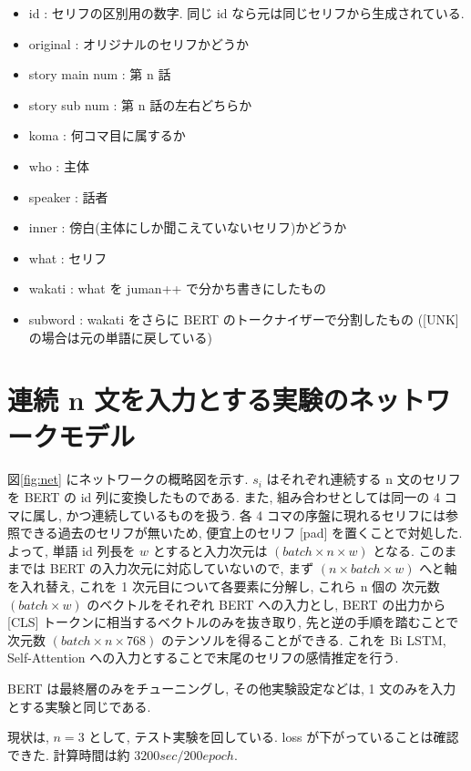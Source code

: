 \documentclass[twocolumn]{jarticle}     %
\begin{document}
\begin{itemize}
  \item id : セリフの区別用の数字. 同じ id なら元は同じセリフから生成されている.
  \item original : オリジナルのセリフかどうか
  \item story main num : 第 n 話
  \item story sub num : 第 n 話の左右どちらか
  \item koma : 何コマ目に属するか
  \item who : 主体
  \item speaker : 話者
  \item inner : 傍白(主体にしか聞こえていないセリフ)かどうか
  \item what : セリフ
  \item wakati : what を juman++ で分かち書きにしたもの
  \item subword : wakati をさらに BERT のトークナイザーで分割したもの ([UNK] の場合は元の単語に戻している)
\end{itemize}

\section{連続 n 文を入力とする実験のネットワークモデル}
図\ref{fig:net} にネットワークの概略図を示す. ${s_i}$ はそれぞれ連続する n 文のセリフを BERT の id 列に変換したものである. また, 組み合わせとしては同一の 4 コマに属し, かつ連続しているものを扱う. 各 4 コマの序盤に現れるセリフには参照できる過去のセリフが無いため, 便宜上のセリフ $[$pad$]$ を置くことで対処した. よって, 単語 id 列長を $w$ とすると入力次元は $(batch \times n \times w)$ となる. このままでは BERT の入力次元に対応していないので, まず $(n \times batch \times w)$ へと軸を入れ替え, これを 1 次元目について各要素に分解し, これら n 個の 次元数 $(batch \times w)$ のベクトルをそれぞれ BERT への入力とし, BERT の出力から [CLS] トークンに相当するベクトルのみを抜き取り, 先と逆の手順を踏むことで次元数 $(batch \times n \times 768)$ のテンソルを得ることができる. これを Bi LSTM, Self-Attention への入力とすることで末尾のセリフの感情推定を行う.

BERT は最終層のみをチューニングし, その他実験設定などは, 1 文のみを入力とする実験と同じである.

現状は, $n = 3$ として, テスト実験を回している. loss が下がっていることは確認できた.
計算時間は約 $3200 sec / 200 epoch$.
\end{document}
